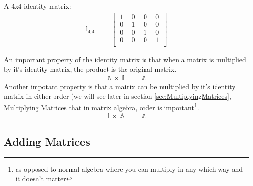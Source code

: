 A 4x4 identity matrix:
\begin{align}
  \mathbb{I}_{4,4}~&=
  \begin{bmatrix}
    ~1~&~0~&~0~&~0~\\
    ~0~&~1~&~0~&~0~\\
    ~0~&~0~&~1~&~0~\\
    ~0~&~0~&~0~&~1~\\
  \end{bmatrix}
  \label{eq:4x4IdentityMatrix}
\end{align}

An important property of the identity matrix is that when a matrix is multiplied
by it's identity matrix, the product is the original matrix.
\begin{align}
  \mathbb{A}~\times~\mathbb{I}~&=~\mathbb{A}
\end{align}
Another impotant property is that a matrix can be multiplied by it's identity
matrix in either order (we will see later in section
\ref{sec:MultiplyingMatrices}, Multiplying Matrices that in matrix
algebra, order is important\footnote{as opposed to normal algebra where you can
multiply in any which way and it doesn't matter}.
\begin{align}
  \mathbb{I}~\times~\mathbb{A}~&=~\mathbb{A}
\end{align}

\subsection{Adding Matrices}
\label{sec:AddingMatrices}

